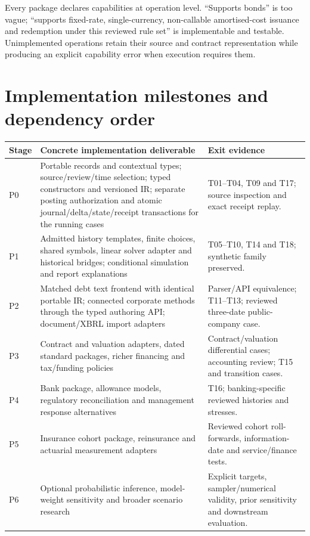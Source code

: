 Every package declares capabilities at operation level. ``Supports bonds'' is
too vague; ``supports fixed-rate, single-currency, non-callable amortised-cost
issuance and redemption under this reviewed rule set'' is implementable and
testable. Unimplemented operations retain their source and contract
representation while producing an explicit capability error when execution
requires them.

\section{Implementation milestones and dependency order}

\begin{longtable}{L{16mm}L{76mm}L{44mm}}
\toprule Stage & Concrete implementation deliverable & Exit evidence\\\midrule\endhead
P0 & Portable records and contextual types; source/review/time selection;
typed constructors and versioned IR; separate posting authorization and atomic
journal/delta/state/receipt transactions for the running cases
& T01--T04, T09 and T17; source inspection and exact receipt replay.\\
P1 & Admitted history templates, finite choices, shared symbols, linear solver
adapter and historical bridges; conditional simulation and report explanations
& T05--T10, T14 and T18;
synthetic family preserved.\\
P2 & Matched debt text frontend with identical portable IR; connected corporate
methods through the typed authoring API;
document/XBRL import adapters & Parser/API equivalence; T11--T13; reviewed
three-date public-company case.\\
P3 & Contract and valuation adapters, dated standard packages, richer financing
and tax/funding policies & Contract/valuation differential cases; accounting
review; T15 and transition cases.\\
P4 & Bank package, allowance models, regulatory reconciliation and management
response alternatives & T16; banking-specific reviewed histories and stresses.\\
P5 & Insurance cohort package, reinsurance and actuarial measurement adapters &
Reviewed cohort roll-forwards, information-date and service/finance tests.\\
P6 & Optional probabilistic inference, model-weight sensitivity and broader
scenario research & Explicit targets, sampler/numerical validity, prior
sensitivity and downstream evaluation.\\\bottomrule
\end{longtable}


